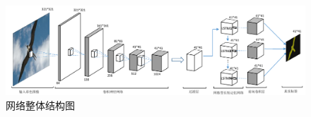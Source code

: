 \begin{figure}[h]
	\centering
	\includegraphics[width=\textwidth]{demo_images/networkstructure.pdf}
	\caption{网络整体结构图}
\end{figure}